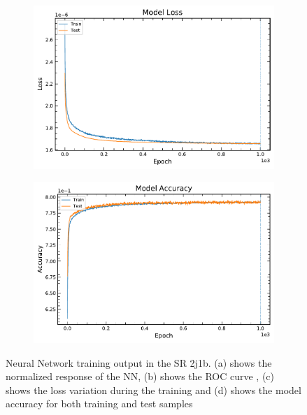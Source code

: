 \begin{figure}[!h]
  \begin{subfigure}[b]{0.48\linewidth}
    \centering
    \includegraphics[width=\linewidth]{ubonn-thesis/Chapters/Chapters_06/Figure/SR_2j1b/loss_PLV_2j1b_L27_20_10_06Oct2021.pdf} %
    \caption{} 
    \label{SR:2j1b:loss} 
  \end{subfigure}%
  \begin{subfigure}[b]{0.48\linewidth}
    \centering
    \includegraphics[width=\linewidth]{ubonn-thesis/Chapters/Chapters_06/Figure/SR_2j1b/acc_PLV_2j1b_L27_20_10_06Oct2021.pdf} 
    \caption{} 
    \label{SR:2j1b:acc} 
  \end{subfigure}
  \vspace*{-0.5cm}
  \caption{Neural Network training output in the SR 2j1b. (a) shows the normalized response of the NN, (b) shows the ROC curve , (c) shows the loss variation during the training and (d) shows the model accuracy for both training and test samples}
  \label{SR:2j1b:NN} 
\end{figure}

